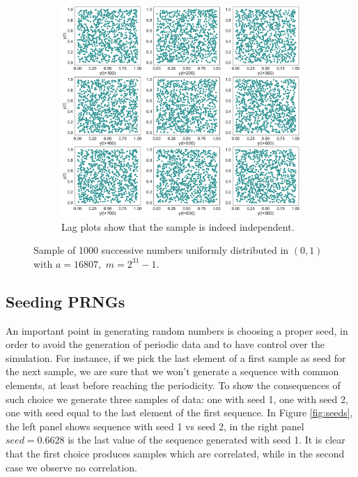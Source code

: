 \documentclass[twoside,onecolumn]{article}
\theoremstyle{definition}
\begin{document}
\begin{figure}
\begin{subfigure}{0.9\textwidth}
         \includegraphics[width=\textwidth]{../results/lag_plots.pdf}
         \caption{Lag plots show that the sample is indeed independent.}\label{fig:lcglag}
     \end{subfigure}\caption{Sample of 1000 successive numbers uniformly distributed in $(0,1)$ with $a = 16807, \,\,m = 2^{31}- 1$. }\label{fig:lcg}
\end{figure}

\subsection{Seeding PRNGs}
An important point in generating random numbers is choosing a proper seed, in order to avoid the generation of periodic data and to have control over the simulation.
For instance, if we pick the last element of a first sample as seed for the next sample, we are sure that we won't generate a sequence with common elements, at least before reaching the periodicity.
To show the consequences of such choice we generate three samples of data: one with seed 1, one with seed 2, one with seed equal to the last element of the first sequence.
In Figure \ref{fig:seeds}, the left panel shows sequence with seed 1 vs seed 2, in the right panel $seed=0.6628$ is the last value of the sequence generated with seed 1.
It is clear that the first choice produces samples which are correlated, while in the second case we observe no correlation.
\end{document}
